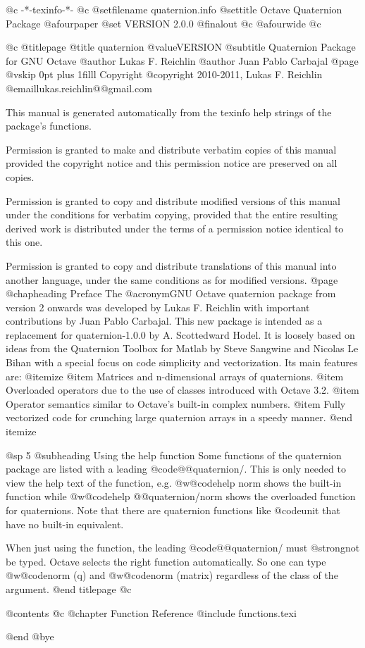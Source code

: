    @c -*-texinfo-*-
@c %
@setfilename quaternion.info
@settitle Octave Quaternion Package
@afourpaper
@set VERSION 2.0.0
@finalout
@c @afourwide
@c %

@c %
@titlepage
@title quaternion @value{VERSION}
@subtitle Quaternion Package for GNU Octave
@author Lukas F. Reichlin
@author Juan Pablo Carbajal
@page
@vskip 0pt plus 1filll
Copyright @copyright{} 2010-2011, Lukas F. Reichlin @email{lukas.reichlin@@gmail.com}

This manual is generated automatically from the texinfo help strings
of the package's functions.

Permission is granted to make and distribute verbatim copies of
this manual provided the copyright notice and this permission notice
are preserved on all copies.

Permission is granted to copy and distribute modified versions of this
manual under the conditions for verbatim copying, provided that the entire
resulting derived work is distributed under the terms of a permission
notice identical to this one.

Permission is granted to copy and distribute translations of this manual
into another language, under the same conditions as for modified versions.
@page
@chapheading Preface
The @acronym{GNU} Octave quaternion package from version 2 onwards
was developed by Lukas F. Reichlin with important contributions by
Juan Pablo Carbajal. This new package is intended as a replacement
for quaternion-1.0.0 by A. Scottedward Hodel. It is loosely based
on ideas from the Quaternion Toolbox for Matlab by Steve Sangwine
and Nicolas Le Bihan with a special focus on code simplicity and
vectorization. Its main features are:
@itemize
@item Matrices and n-dimensional arrays of quaternions.
@item Overloaded operators due to the use of classes introduced with Octave 3.2.
@item Operator semantics similar to Octave's built-in complex numbers.
@item Fully vectorized code for crunching large quaternion arrays in a speedy manner.
@end itemize


@sp 5
@subheading Using the help function
Some functions of the quaternion package are listed with a leading @code{@@quaternion/}.
This is only needed to view the help text of the function, e.g. @w{@code{help norm}}
shows the built-in function while @w{@code{help @@quaternion/norm}} shows the overloaded
function for quaternions. Note that there are quaternion functions
like @code{unit} that have no built-in equivalent.

When just using the function, the leading @code{@@quaternion/} must @strong{not} be typed.
Octave selects the right function automatically. So one can type @w{@code{norm (q)}}
and @w{@code{norm (matrix)}} regardless of the class of the argument.
@end titlepage
@c %

@contents
@c @chapter Function Reference
@include functions.texi

@end
@bye
